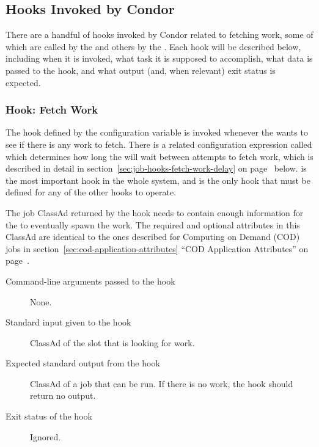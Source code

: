 \subsection{\label{sec:job-hooks-hooks}
Hooks Invoked by Condor}

There are a handful of hooks invoked by Condor related to fetching
work, some of which are called by the  and others by
the .
Each hook will be described below, including when it is invoked, what
task it is supposed to accomplish, what data is passed to the hook,
and what output (and, when relevant) exit status is expected.


\subsubsection{\label{sec:job-hooks-fetch-work}
Hook: Fetch Work}

The hook defined by the configuration variable
 is invoked whenever the 
wants to see if there is any work to fetch.
There is a related configuration expression called
 which determines how long the 
will wait between attempts to fetch work, which is described in detail
in section~\ref{sec:job-hooks-fetch-work-delay} on
page~\pageref{sec:job-hooks-fetch-work-delay} below.
 is the most important hook in the whole
system, and is the only hook that must be defined for any of the other
 hooks to operate.

The job ClassAd returned by the hook needs to contain enough
information for the  to eventually spawn the work.
The required and optional attributes in this ClassAd are identical to
the ones described for Computing on Demand (COD) jobs in
section~\ref{sec:cod-application-attributes} 
``COD Application Attributes'' on
page~\pageref{sec:cod-application-attributes}.

\begin{description}
\item[Command-line arguments passed to the hook]
  None.

\item[Standard input given to the hook]
  ClassAd of the slot that is looking for work.

\item[Expected standard output from the hook]
  ClassAd of a job that can be run.
  If there is no work, the hook should return no output.

\item[Exit status of the hook]
  Ignored.
\end{description}



